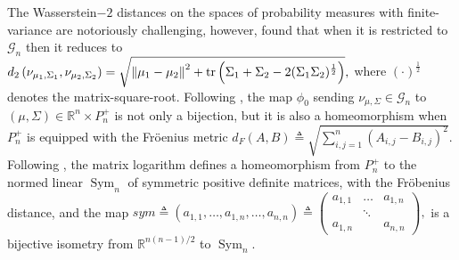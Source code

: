 \documentclass[anon,12pt]{colt2021} %
\newcommand{\rr}{{\mathbb{R}}}
\newcommand{\rrflex}[1]{{\ensuremath{\rr^{#1}
}}}
\newcommand{\rrn}{{\rrflex{n}}}
\renewcommand{\ggg}{{\mathscr{G}}}
\begin{document}
	The Wasserstein$-2$ distances on the spaces of probability measures with finite-variance are notoriously challenging, however, \cite{DowsonLandau1982} found that when it is restricted to $\ggg_n$ then it reduces to 
	$ %
	d_{2}\left(
	\nu_{\mu_1,\Sigma_1}
	,
	\nu_{\mu_2,\Sigma_2}
	\right)
	=
	\sqrt{
		\left\|
		\mu_1-\mu_2
		\right\|^2
		+
		\operatorname{tr}\left(
		\Sigma_1 + \Sigma_2 - 2(\Sigma_1\Sigma_2)^{\frac1{2}}
		\right)
	}
,
	$ %
	where $(\cdot)^{\frac1{2}}$ denotes the matrix-square-root.
	Following \cite{MalagoWasserstein2018}, the map $\phi_0$ sending $\nu_{\mu,\Sigma}\in \ggg_n$ to $(\mu,\Sigma) \in \rrn\times P_n^+$ is not only a bijection, but it is also a homeomorphism when $P_n^+$ is equipped with the Fr\"{o}enius metric $d_F(A,B)\triangleq \sqrt{\sum_{i,j=1}^n(A_{i,j}-B_{i,j})^2}$.  Following \cite{BonnabelPSD}, the matrix logarithm defines a homeomorphism from $P_n^+$ to the normed linear $\operatorname{Sym}_n$ of symmetric positive definite matrices, with the Fr\"{o}benius distance, and the map 
	$ %
	sym\triangleq
	\left(
a_{1,1},\dots,a_{1,n},\dots,a_{n,n}
\right)
\triangleq
\begin{pmatrix}
a_{1,1} & \dots & a_{1,n} \\
  & \ddots &  \\
a_{1,n}  &  & a_{n,n}
\end{pmatrix}
,
$ %
is a bijective isometry from $\rrflex{n(n-1)/2}$ to $\operatorname{Sym}_n$.  
	
\end{document}
